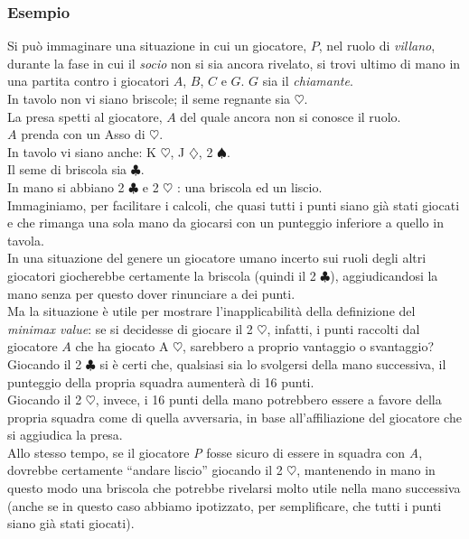 \subsubsection*{Esempio}
Si può immaginare una situazione in cui un giocatore, $P$, nel ruolo di \emph{villano}, durante la fase in cui il \emph{socio} non si sia ancora rivelato, si trovi ultimo di mano in una partita contro i giocatori $A$, $B$, $C$ e $G$. $G$ sia il \emph{chiamante}.\\
In tavolo non vi siano briscole; il seme regnante sia $\heartsuit$.\\
La presa spetti al giocatore, $A$ del quale ancora non si conosce il ruolo.\\
$A$ prenda con un Asso di $\heartsuit$.\\
In tavolo vi siano anche: K $\heartsuit$, J $\diamondsuit$, 2 $\spadesuit$.\\
Il seme di briscola sia $\clubsuit$.\\
In mano si abbiano 2 $\clubsuit$ e 2 $\heartsuit$ : una briscola ed un liscio.\\
Immaginiamo, per facilitare i calcoli, che quasi tutti i punti siano già stati giocati e che rimanga una sola mano da giocarsi con un punteggio inferiore a quello in tavola.\\
In una situazione del genere un giocatore umano incerto sui ruoli degli altri giocatori giocherebbe certamente la briscola (quindi il 2 $\clubsuit$), aggiudicandosi la mano senza per questo dover rinunciare a dei punti.\\
Ma la situazione è utile per mostrare l'inapplicabilità della definizione del \emph{minimax value}: se si decidesse di giocare il 2 $\heartsuit$, infatti, i punti raccolti dal giocatore $A$ che ha giocato A $\heartsuit$, sarebbero a proprio vantaggio o svantaggio?\\
Giocando il 2 $\clubsuit$ si è certi che, qualsiasi sia lo svolgersi della mano successiva, il punteggio della propria squadra aumenterà di 16 punti.\\
Giocando il 2 $\heartsuit$, invece, i 16 punti della mano potrebbero essere a favore della propria squadra come di quella avversaria, in base all'affiliazione del giocatore che si aggiudica la presa.\\
Allo stesso tempo, se il giocatore \emph{P} fosse sicuro di essere in squadra con \emph{A}, dovrebbe certamente ``andare liscio'' giocando il 2 $\heartsuit$, mantenendo in mano in questo modo una briscola che potrebbe rivelarsi molto utile nella mano successiva (anche se in questo caso abbiamo ipotizzato, per semplificare, che tutti i punti siano già stati giocati).


